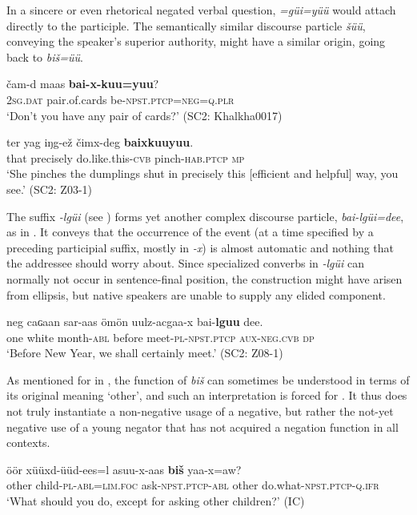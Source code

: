 \documentclass[output=paper,colorlinks,citecolor=brown,chinesefont]{langscibook}
\begin{document}
In a sincere or even rhetorical negated verbal question, \textit{=güi=yüü} would attach directly to the participle. The semantically similar discourse particle \textit{šüü}, conveying the speaker’s superior authority, might have a similar origin, going back to \textit{biš=üü}.


\ea\label{ex:kha:92}
    \gll čam-d maas \textbf{bai-x-kuu=yuu}?  \\ 
         2\textsc{sg.dat} pair.of.cards be-\textsc{npst.ptcp=neg=q.plr} \\
    \glt ‘Don’t you have any pair of cards?’ (SC2: Khalkha0017)
\z 

\ea\label{ex:kha:93}
    \gll ter yag iŋg-ež čimx-deg \textbf{baixkuuyuu}. \\ 
         that precisely do.like.this-\textsc{cvb} pinch-\textsc{hab.ptcp} \textsc{mp} \\
    \glt ‘She pinches the dumplings shut in precisely this [efficient and helpful] way, you see.’ (SC2: Z03-1)
\z 
 
The suffix \textit{-lgüi} (see ) forms yet another complex discourse particle, \textit{bai-lgüi=dee}, as in . It conveys that the occurrence of the event (at a time specified by a preceding participial suffix, mostly in \textit{-x}) is almost automatic and nothing that the addressee should worry about. Since specialized converbs in \textit{-lgüi} can normally not occur in sentence-final position, the construction might have arisen from ellipsis, but native speakers are unable to supply any elided component.


\ea\label{ex:kha:94}
    \gll neg caɢaan sar-aas   ömön uulz-acgaa-x bai-\textbf{lguu} dee. \\ 
         one white month\textsc{-abl} before meet\textsc{-pl-npst.ptcp} \textsc{aux-neg.cvb} \textsc{dp} \\
    \glt ‘Before New Year, we shall certainly meet.’ (SC2: Z08-1)
\z 
 
As mentioned for  in , the function of \textit{biš} can sometimes be understood in terms of its original meaning ‘other’, and such an interpretation is forced for . It thus does not truly instantiate a non-negative usage of a negative, but rather the not-yet negative use of a young negator that has not acquired a negation function in all contexts. 


\ea\label{ex:kha:95}
    \gll öör   xüüxd-üüd-ees=l asuu-x-aas \textbf{biš} yaa-x=aw? \\ 
         other child-\textsc{pl-abl=lim.foc} ask-\textsc{npst.ptcp-abl} other do.what-\textsc{npst.ptcp-q.ifr} \\
    \glt ‘What should you do, except for asking other children?’ (IC)
\z 
\end{document}
